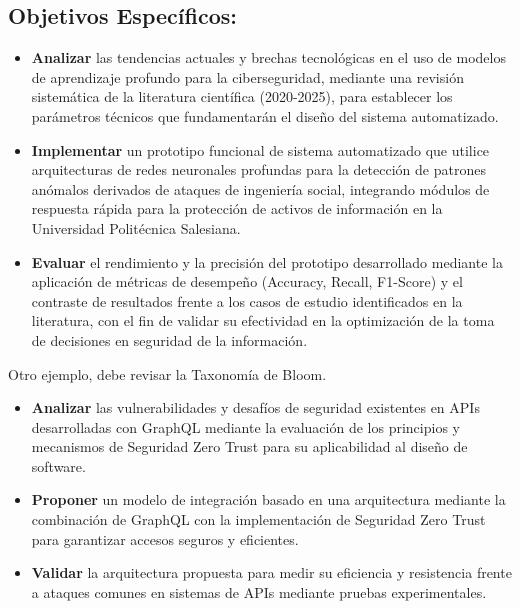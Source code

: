 \documentclass[12pt]{article}
\begin{document}
\subsection{Objetivos Específicos:}

\begin{itemize}
    \item {\color{orange}\textbf{Analizar}} las tendencias actuales y brechas tecnológicas en el uso de modelos de aprendizaje profundo para la ciberseguridad, mediante una revisión sistemática de la literatura científica (2020-2025), para establecer los parámetros técnicos que fundamentarán el diseño del sistema automatizado.
    \item {\color{orange}\textbf{Implementar}} un prototipo funcional de sistema automatizado que utilice arquitecturas de redes neuronales profundas para la detección de patrones anómalos derivados de ataques de ingeniería social, integrando módulos de respuesta rápida para la protección de activos de información en la Universidad Politécnica Salesiana.
    \item {\color{orange}\textbf{Evaluar}} el rendimiento y la precisión del prototipo desarrollado mediante la aplicación de métricas de desempeño (Accuracy, Recall, F1-Score) y el contraste de resultados frente a los casos de estudio identificados en la literatura, con el fin de validar su efectividad en la optimización de la toma de decisiones en seguridad de la información.
\end{itemize}

Otro ejemplo, debe revisar la Taxonomía de Bloom.

\begin{itemize}
    \item {\color{orange}\textbf{Analizar}} las vulnerabilidades y desafíos de seguridad existentes en APIs desarrolladas con GraphQL mediante la evaluación de los principios y mecanismos de Seguridad Zero Trust para su aplicabilidad al diseño de software.
    \item {\color{orange}\textbf{Proponer}} un modelo de integración basado en una arquitectura mediante la combinación de GraphQL con la implementación de Seguridad Zero Trust para garantizar accesos seguros y eficientes.
    \item {\color{orange}\textbf{Validar}} la arquitectura propuesta para medir su eficiencia y resistencia frente a ataques comunes en sistemas de APIs mediante pruebas experimentales.
\end{itemize}
\end{document}
